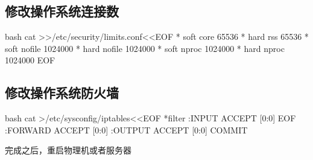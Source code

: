 \subsection{修改操作系统连接数}
\begin{code-block}{bash}
cat >>/etc/security/limits.conf<<EOF
*               soft    core            65536
*               hard    rss             65536
*               soft    nofile          1024000
*               hard    nofile          1024000
*               soft    nproc           1024000
*               hard    nproc           1024000
EOF
\end{code-block}

\subsection{修改操作系统防火墙}
\begin{code-block}{bash}
cat >/etc/sysconfig/iptables<<EOF
*filter
:INPUT ACCEPT [0:0]
EOF
:FORWARD ACCEPT [0:0]
:OUTPUT ACCEPT [0:0]
COMMIT
\end{code-block}

\noindent
完成之后，重启物理机或者服务器
\justifying